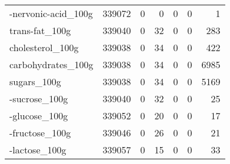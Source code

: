 \begin{tabular}{lrrrrrr}
-nervonic-acid\_100g                        &                                        339072 &                                         0 &                                             0 &                                         0 &                      0 &                1 \\
trans-fat\_100g                             &                                        339040 &                                         0 &                                            32 &                                         0 &                      0 &              283 \\
cholesterol\_100g                           &                                        339038 &                                         0 &                                            34 &                                         0 &                      0 &              422 \\
carbohydrates\_100g                         &                                        339038 &                                         0 &                                            34 &                                         0 &                      0 &             6985 \\
sugars\_100g                                &                                        339038 &                                         0 &                                            34 &                                         0 &                      0 &             5169 \\
-sucrose\_100g                              &                                        339040 &                                         0 &                                            32 &                                         0 &                      0 &               25 \\
-glucose\_100g                              &                                        339052 &                                         0 &                                            20 &                                         0 &                      0 &               17 \\
-fructose\_100g                             &                                        339046 &                                         0 &                                            26 &                                         0 &                      0 &               21 \\
-lactose\_100g                              &                                        339057 &                                         0 &                                            15 &                                         0 &                      0 &               33 \\

\end{tabular}
